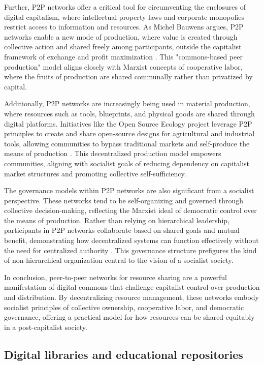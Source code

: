 \begin{refsection}
Further, P2P networks offer a critical tool for circumventing the enclosures of digital capitalism, where intellectual property laws and corporate monopolies restrict access to information and resources. As Michel Bauwens argues, P2P networks enable a new mode of production, where value is created through collective action and shared freely among participants, outside the capitalist framework of exchange and profit maximization \cite[pp.~32-33]{bauwens2005}. This "commons-based peer production" model aligns closely with Marxist concepts of cooperative labor, where the fruits of production are shared communally rather than privatized by capital.

Additionally, P2P networks are increasingly being used in material production, where resources such as tools, blueprints, and physical goods are shared through digital platforms. Initiatives like the Open Source Ecology project leverage P2P principles to create and share open-source designs for agricultural and industrial tools, allowing communities to bypass traditional markets and self-produce the means of production \cite[pp.~49-50]{jackson2014}. This decentralized production model empowers communities, aligning with socialist goals of reducing dependency on capitalist market structures and promoting collective self-sufficiency.

The governance models within P2P networks are also significant from a socialist perspective. These networks tend to be self-organizing and governed through collective decision-making, reflecting the Marxist ideal of democratic control over the means of production. Rather than relying on hierarchical leadership, participants in P2P networks collaborate based on shared goals and mutual benefit, demonstrating how decentralized systems can function effectively without the need for centralized authority \cite[pp.~71-73]{ostrom1990}. This governance structure prefigures the kind of non-hierarchical organization central to the vision of a socialist society.

In conclusion, peer-to-peer networks for resource sharing are a powerful manifestation of digital commons that challenge capitalist control over production and distribution. By decentralizing resource management, these networks embody socialist principles of collective ownership, cooperative labor, and democratic governance, offering a practical model for how resources can be shared equitably in a post-capitalist society.

\subsection{Digital libraries and educational repositories}


\end{refsection}

